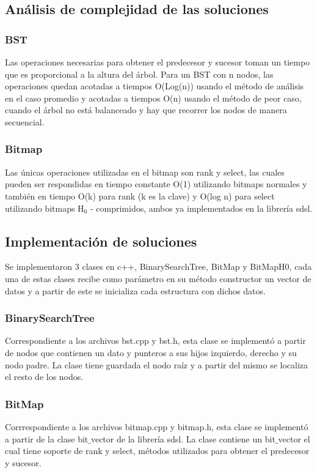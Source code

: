 \documentclass[11pt]{article}
\begin{document}
\subsection{Análisis de complejidad de las soluciones}
\subsubsection{BST}
Las operaciones necesarias para obtener el predecesor y sucesor toman un tiempo que es proporcional a la altura del árbol. Para un BST con n nodos, las operaciones quedan acotadas a tiempos O(Log(n)) usando el método de análisis en el caso promedio y acotadas a tiempos O(n) usando el método de peor caso, cuando el árbol no está balanceado y hay que recorrer los nodos de manera secuencial.
\subsubsection{Bitmap}
Las únicas operaciones utilizadas en el bitmap son rank y select, las cuales pueden ser respondidas en tiempo constante O(1) utilizando bitmaps normales y también en tiempo O(k) para rank (k es la clave) y O(log n)  para select utilizando bitmaps H$_{0}$ - comprimidos, ambos ya implementados en la librería sdsl.
\subsection{Implementación de soluciones}
Se implementaron 3 clases en c++, BinarySearchTree, BitMap y BitMapH0, cada una de estas clases recibe como parámetro en su método constructor un vector de datos y a partir de este se inicializa cada estructura con dichos datos.

\subsubsection{BinarySearchTree}
Correspondiente a los archivos bst.cpp y bst.h, esta clase se implementó a partir de nodos que contienen un dato y punteros a sus hijos izquierdo, derecho y su nodo padre. La clase tiene guardada el nodo raíz y a partir del mismo se localiza el resto de los nodos.
\subsubsection{BitMap}
Corrrespondiente a los archivos bitmap.cpp y bitmap.h, esta clase se implementó a partir de la clase bit$\_$vector de la librería sdsl. La clase contiene un bit$\_$vector el cual tiene soporte de rank y select, métodos utilizados para obtener el predecesor y sucesor.
\end{document}

